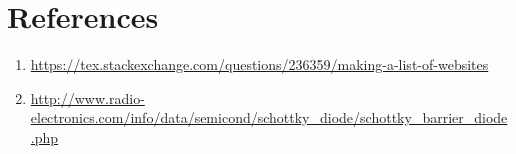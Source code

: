 \documentclass{article}
\begin{document}
\section{References}
\begin{enumerate}
	\item \label{ref:schottky} \url{https://tex.stackexchange.com/questions/236359/making-a-list-of-websites}
	\item \label{ref:schottky2} \url{http://www.radio-electronics.com/info/data/semicond/schottky_diode/schottky_barrier_diode.php}
\end{enumerate}
\end{document}
